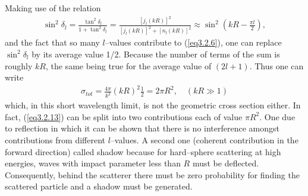 Making use of the relation
\begin{align}\label{eq3.2.7}
\sin^2\delta_l=\frac{\tan^2\delta_l}{1+\tan^2\delta_l}=\frac{[j_l(kR)]^2}{[j_l(kR)]^2+[n_l(kR)]^2}\approx\sin^2\left(kR-\frac{\pi l}{2}\right),
\end{align}
and the fact that so many $l$--values contribute to (\ref{eq3.2.6}), one can replace $\sin^2\delta_l$ by its average value 1/2. Because the number of terms of the sum is roughly $kR$, the same being true for the average value of $(2l+1)$. Thus one can write
\begin{align}\label{eq3.2.13}
\sigma_{tot}=\frac{4\pi}{k^2}(kR)^2\frac{1}{2}=2\pi R^2,\quad (kR\gg1)
\end{align}
which, in this short wavelength limit, is not the geometric cross section either. In fact, (\ref{eq3.2.13}) can be split into two contributions each of value $\pi R^2$. One due to reflection in which it can be shown that there is no interference amongst contributions from different $l$--values. A second one (coherent contribution in the forward direction) called shadow because for hard--sphere scattering at high energies, waves with impact parameter less than $R$ must be deflected. Consequently, behind the scatterer there must be zero probability for finding the scattered particle and a shadow must be generated.


